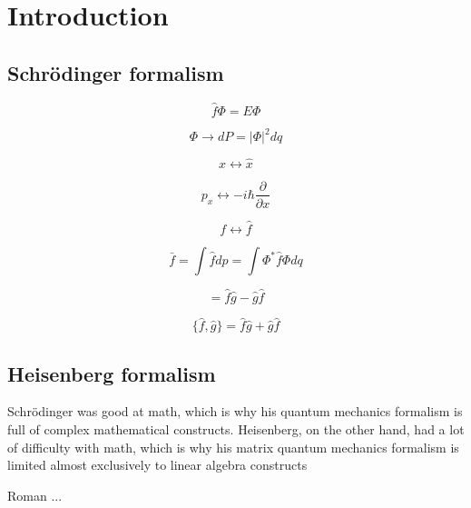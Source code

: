 \section{Introduction}
	\subsection{Schr\"odinger formalism}
	
		\begin{equation}
			\hat{f}\Phi =  E \Phi
		\end{equation}
	
		\begin{equation}
			\Phi \rightarrow dP = |\Phi|^2dq
		\end{equation}
		
		\begin{equation}
			x \leftrightarrow \hat{x}
		\end{equation}

		\begin{equation}
			p_x \leftrightarrow -i\hbar \frac{\partial}{\partial x}
		\end{equation}
	
		\begin{equation}
			f \leftrightarrow \hat{f}
		\end{equation}	
		
		\begin{equation}
			\bar{f} = \int \hat{f}dp = \int \Phi^* \hat{f} \Phi dq 
		\end{equation}
		
		\begin{equation}
			[\hat{f}, \hat{g}] = \hat{f}\hat{g} - \hat{g}\hat{f}
		\end{equation}

		\begin{equation}
		\{\hat{f}, \hat{g}\} = \hat{f}\hat{g} + \hat{g}\hat{f}
		\end{equation}
	
	\subsection{Heisenberg formalism}
		\epigraph{Schr\"odinger was good at math, which is why his quantum mechanics formalism is full of complex mathematical constructs. Heisenberg, on the other hand, had a lot of difficulty with math, which is why his matrix quantum mechanics formalism is limited almost exclusively to linear algebra constructs}{Roman ... }
	
